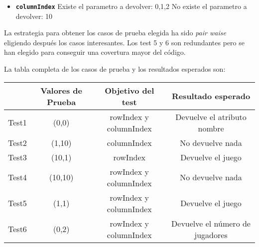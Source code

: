 \begin{itemize}
\item \textbf{\texttt{columnIndex}}
\subitem Existe el parametro a devolver: 0,1,2
\subitem No existe el parametro a devolver: 10
\end{itemize}

La estrategia para obtener los casos de prueba elegida ha sido
\textit{pair waise} eligiendo despu\'es los casos interesantes. Los test 5 y 6 son redundantes pero se han elegido
para conseguir una covertura mayor del c\'odigo.

La tabla completa de los casos de prueba y los resultados esperados son:

{\footnotesize
\begin{longtable}[c]{lccc}
 & \textbf{Valores de Prueba} & \textbf{Objetivo del test} & \textbf{Resultado esperado} \\
\hline \hline
\endhead

Test1 & (0,0) & rowIndex y columnIndex & Devuelve el atributo nombre\\
Test2 & (1,10) & columnIndex & No devuelve nada\\
Test3 & (10,1) & rowIndex & Devuelve el juego\\
Test4 & (10,10) & rowIndex y columnIndex & No devuelve nada\\
Test5 & (1,1) & rowIndex y columnIndex & Devuelve el juego\\
Test6 & (0,2) & rowIndex y columnIndex & Devuelve el n\'umero de jugadores\\

\hline
\end{longtable}
}